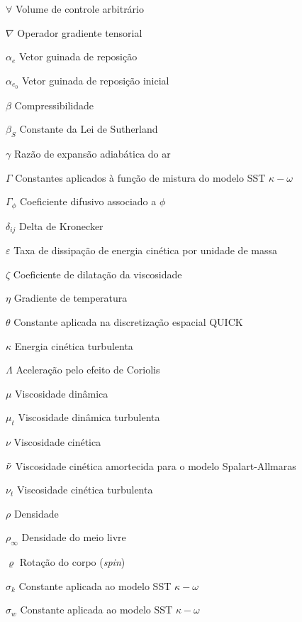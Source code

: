 
\begin{simbolos}
  \item[\(\forall\)] Volume de controle arbitrário
  \item[\(\nabla\)] Operador gradiente tensorial
  \item[\(\alpha_e\)] Vetor guinada de reposição
  \item[\(\alpha_{e_0}\)] Vetor guinada de reposição inicial
  \item[\(\beta\)] Compressibilidade
  \item[\(\beta_S\)] Constante da Lei de Sutherland
  \item[\(\gamma\)] Razão de expansão adiabática do ar
  \item[\(\Gamma\)] Constantes aplicados à função de mistura do modelo SST \(\kappa-\omega\)
  \item[\(\Gamma_{\phi}\)] Coeficiente difusivo associado a \(\phi\)
  \item[\(\delta_{ij}\)] Delta de Kronecker
  \item[\(\varepsilon\)] Taxa de dissipação de energia cinética por unidade de massa
  \item[\(\zeta\)] Coeficiente de dilatação da viscosidade
  \item[\(\eta\)] Gradiente de temperatura
  \item[\(\theta\)] Constante aplicada na discretização espacial QUICK
  \item[\(\kappa\)] Energia cinética turbulenta
  \item[\(\Lambda\)] Aceleração pelo efeito de Coriolis
  \item[\(\mu\)] Viscosidade dinâmica
  \item[\(\mu_t\)] Viscosidade dinâmica turbulenta
  \item[\(\nu\)] Viscosidade cinética
  \item[\(\Tilde{\nu}\)] Viscosidade cinética amortecida para o modelo Spalart-Allmaras
  \item[\(\nu_t\)] Viscosidade cinética turbulenta
  \item[\(\rho \)] Densidade
  \item[\(\rho_\infty\)] Densidade do meio livre
  \item[\(\varrho\)] Rotação do corpo (\textit{spin})
  \item[\(\sigma_k\)] Constante aplicada ao modelo SST \(\kappa-\omega\)
  \item[\(\sigma_w\)] Constante aplicada ao modelo SST \(\kappa-\omega\)

\end{simbolos}
